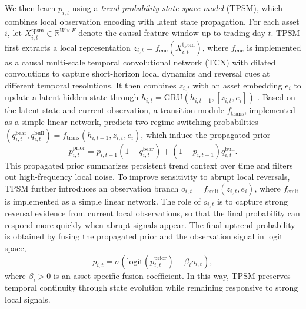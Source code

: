 \documentclass[letterpaper]{article} %
\begin{document}
We then learn \(p_{i,t}\) using a \emph{trend probability state-space model} (TPSM), which combines local observation encoding with latent state propagation. For each asset \(i\), let \(X_{i,t}^{\mathrm{tpsm}}\in\mathbb{R}^{W\times F}\) denote the causal feature window up to trading day \(t\). TPSM first extracts a local representation \(z_{i,t}=f_{\mathrm{enc}}(X_{i,t}^{\mathrm{tpsm}})\), where \(f_{\mathrm{enc}}\) is implemented as a causal multi-scale temporal convolutional network (TCN) with dilated convolutions to capture short-horizon local dynamics and reversal cues at different temporal resolutions. It then combines \(z_{i,t}\) with an asset embedding \(e_i\) to update a latent hidden state through \(h_{i,t}=\mathrm{GRU}(h_{i,t-1},[z_{i,t},e_i])\) \citep{Chung2014EmpiricalEO}. Based on the latent state and current observation, a transition module \(f_{\mathrm{trans}}\), implemented as a simple linear network, predicts two regime-switching probabilities \((q_{i,t}^{\mathrm{bear}},q_{i,t}^{\mathrm{bull}})=f_{\mathrm{trans}}(h_{i,t-1},z_{i,t},e_i)\), which induce the propagated prior
\[
p_{i,t}^{\mathrm{prior}}
=
p_{i,t-1}(1-q_{i,t}^{\mathrm{bear}})
+
(1-p_{i,t-1})q_{i,t}^{\mathrm{bull}}.
\]
This propagated prior summarizes persistent trend context over time and filters out high-frequency local noise. To improve sensitivity to abrupt local reversals, TPSM further introduces an observation branch \(o_{i,t}=f_{\mathrm{emit}}(z_{i,t},e_i)\), where \(f_{\mathrm{emit}}\) is implemented as a simple linear network. The role of \(o_{i,t}\) is to capture strong reversal evidence from current local observations, so that the final probability can respond more quickly when abrupt signals appear. The final uptrend probability is obtained by fusing the propagated prior and the observation signal in logit space,
\[
p_{i,t}
=
\sigma\!\left(
\mathrm{logit}(p_{i,t}^{\mathrm{prior}})+\beta_i o_{i,t}
\right),
\]
where \(\beta_i>0\) is an asset-specific fusion coefficient. In this way, TPSM preserves temporal continuity through state evolution while remaining responsive to strong local signals.
\end{document}
